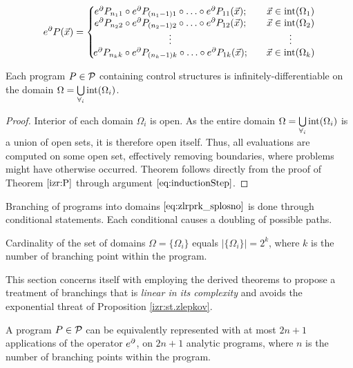  \begin{equation}
   \label{eq:Dzlrprk_splosno}
   e^\partial P({\vec{x}}) =
   \left\{\!\begin{matrix}
     e^\partial P_{n_11}\circ e^\partial P_{(n_1-1)1}\circ\ldots\circ e^\partial P_{11}(\vec{x});&\quad \vec{x}\in\operatorname{int}(\Omega_1)\\
     e^\partial P_{n_22}\circ e^\partial P_{(n_2-1)2}\circ\ldots\circ e^\partial P_{12}(\vec{x});&\quad \vec{x}\in\operatorname{int}(\Omega_2)\\
     \vdots&\quad\vdots\\
     e^\partial P_{n_kk}\circ e^\partial P_{(n_k-1)k}\circ\ldots\circ e^\partial P_{1k}(\vec{x});&\quad \vec{x}\in\operatorname{int}(\Omega_k)\\
   \end{matrix}\right.
 \end{equation}

 \begin{theorem}\label{izr:diferentiableOnDomain}
 Each program $P\in\mathcal{P}$ containing control structures is infinitely-differentiable on the domain $\Omega=\bigcup\limits_{\forall_i}\operatorname{int}(\Omega_i)$.
 \end{theorem}
 \begin{proof}
  Interior of each domain $\Omega_i$ is open. As the entire domain $\Omega=\bigcup\limits_{\forall_i}\operatorname{int}(\Omega_i)$ is a union of open sets, it is therefore open itself. Thus, all evaluations are computed on some open set, effectively removing boundaries, where problems might have otherwise occurred. Theorem follows directly from the proof of Theorem $\ref{izr:P}$ through argument $\eqref{eq:inductionStep}$.
 \end{proof}
 

Branching of programs into domains $\eqref{eq:zlrprk_splosno}$ is done through conditional statements. Each conditional causes a doubling of possible paths.

\begin{proposition}\label{izr:st.zlepkov}
Cardinality of the set of domains $\Omega=\{\Omega_i\}$ equals $\lvert\{\Omega_i
\}\rvert=2^k$, where $k$ is the number of branching point within the program.
\end{proposition}

This section concerns itself with employing the derived theorems to propose a treatment of branchings that is \emph{linear in its complexity} and avoids the exponential threat of Proposition \ref{izr:st.zlepkov}.

\begin{theorem}\label{izr:2n+1}
A program $P\in\mathcal{P}$ can be equivalently represented with at most $2n+1$
applications of the operator $e^\partial$, on $2n+1$ analytic programs, where
$n$ is the number of branching points within the program.
\end{theorem}

